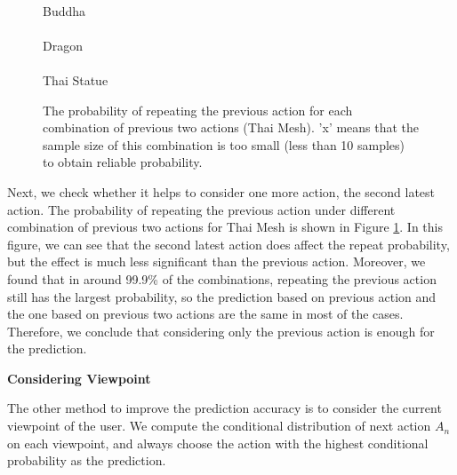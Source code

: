 \begin{figure}
    \centering
    \\
    Buddha\\
    \\
    Dragon\\
    \\
    Thai Statue
    \caption{The probability of repeating the previous action for each combination of previous two actions (Thai Mesh).
    'x' means that the sample size of this combination is too small (less than 10 samples) to obtain reliable probability.}
    \label{f:user:prev2}
\end{figure}
Next, we check whether it helps to consider one more action, the second latest action. 
The probability of repeating the previous action under different combination of
previous two actions for Thai Mesh is shown in Figure \ref{f:user:prev2}.
In this figure, we can see that the second latest action does affect the 
repeat probability, but the effect is much less significant than the previous action. 
Moreover, we found that in around 99.9\% of the combinations, 
repeating the previous action still has the largest probability,
so the prediction based on previous action and the one based on previous two actions are the same in
most of the cases. 
Therefore, we conclude that considering only the previous action is enough for the prediction.

\textbf{Considering Viewpoint}

The other method to improve the prediction accuracy is to consider the current viewpoint of the user.
We compute the conditional distribution of next action $A_n$ on each viewpoint, 
and always choose the action with the highest conditional probability as the prediction.

